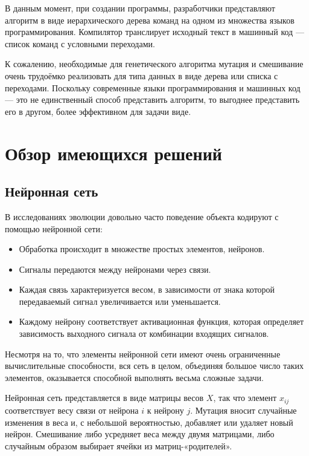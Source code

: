 \documentclass[utf8,a5paper,portrait,10pt]{eskdtext}
\begin{document}
В данным момент, при создании программы, разработчики представляют алгоритм в
виде иерархического дерева команд на одном из множества языков программирования.
Компилятор транслирует исходный текст в машинный код — список команд с условными
переходами.

К сожалению, необходимые для генетического алгоритма мутация и смешивание очень
трудоёмко реализовать для типа данных в виде дерева или списка с переходами.
Поскольку современные языки программирования и машинных код — это не
единственный способ представить алгоритм, то выгоднее представить его в другом,
более эффективном для задачи виде.

\newpage
\section{Обзор имеющихся решений}

\subsection{Нейронная сеть}

В исследованиях эволюции\cite{communication} довольно часто поведение объекта 
кодируют с помощью нейронной сети:\cite{neural}
\begin{itemize}
  \item Обработка происходит в множестве простых элементов, нейронов.
  \item Сигналы передаются между нейронами через связи.
  \item Каждая связь характеризуется весом, в зависимости от знака которой
        передаваемый сигнал увеличивается или уменьшается.
  \item Каждому нейрону соответствует активационная функция, которая определяет 
        зависимость выходного сигнала от комбинации входящих сигналов.
\end{itemize}

Несмотря на то, что элементы нейронной сети имеют очень ограниченные
вычислительные способности, вся сеть в целом, объединяя большое число таких
элементов, оказывается способной выполнять весьма сложные задачи.

Нейронная сеть представляется в виде матрицы весов $X$, так что элемент
$x_{ij}$ соответствует весу связи от нейрона $i$ к нейрону $j$. Мутация
вносит случайные изменения в веса и, с небольшой вероятностью, добавляет или
удаляет новый нейрон. Смешивание либо усредняет веса между двумя матрицами, либо
случайным образом выбирает ячейки из матриц-«родителей».
\end{document}
